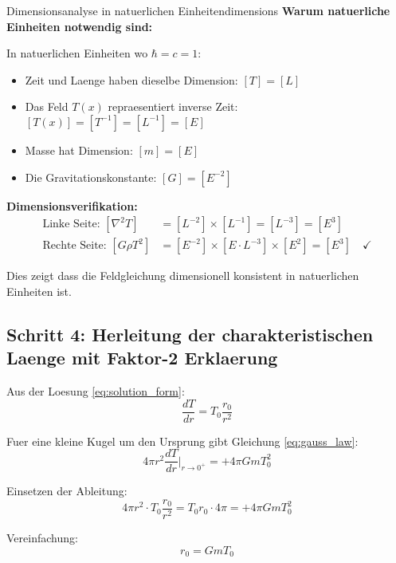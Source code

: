 \documentclass[12pt,a4paper]{article}
\begin{document}
	\begin{important}{Dimensionsanalyse in natuerlichen Einheiten}{dimensions}
		\textbf{Warum natuerliche Einheiten notwendig sind:}
		
		In natuerlichen Einheiten wo $\hbar = c = 1$:
		\begin{itemize}
			\item Zeit und Laenge haben dieselbe Dimension: $[T] = [L]$
			\item Das Feld $T(x)$ repraesentiert inverse Zeit: $[T(x)] = [T^{-1}] = [L^{-1}] = [E]$
			\item Masse hat Dimension: $[m] = [E]$
			\item Die Gravitationskonstante: $[G] = [E^{-2}]$
		\end{itemize}
		
		\textbf{Dimensionsverifikation:}
		\begin{align}
			\text{Linke Seite: } [\nabla^2 T] &= [L^{-2}] \times [L^{-1}] = [L^{-3}] = [E^3] \\
			\text{Rechte Seite: } [G \rho T^2] &= [E^{-2}] \times [E \cdot L^{-3}] \times [E^2] = [E^3] \quad \checkmark
		\end{align}
		
		Dies zeigt dass die Feldgleichung dimensionell konsistent in natuerlichen Einheiten ist.
	\end{important}
	
	\subsection{Schritt 4: Herleitung der charakteristischen Laenge mit Faktor-2 Erklaerung}
	
	Aus der Loesung \eqref{eq:solution_form}:
	\begin{equation}
		\frac{dT}{dr} = T_0 \frac{r_0}{r^2}
	\end{equation}
	
	Fuer eine kleine Kugel um den Ursprung gibt Gleichung \eqref{eq:gauss_law}:
	\begin{equation}
		4\pi r^2 \frac{dT}{dr}\bigg|_{r \to 0^+} = +4\pi G m T_0^2
	\end{equation}
	
	Einsetzen der Ableitung:
	\begin{equation}
		4\pi r^2 \cdot T_0 \frac{r_0}{r^2} = T_0 r_0 \cdot 4\pi = +4\pi G m T_0^2
	\end{equation}
	
	Vereinfachung:
	\begin{equation}
		r_0 = G m T_0
	\end{equation}
	
\end{document}
